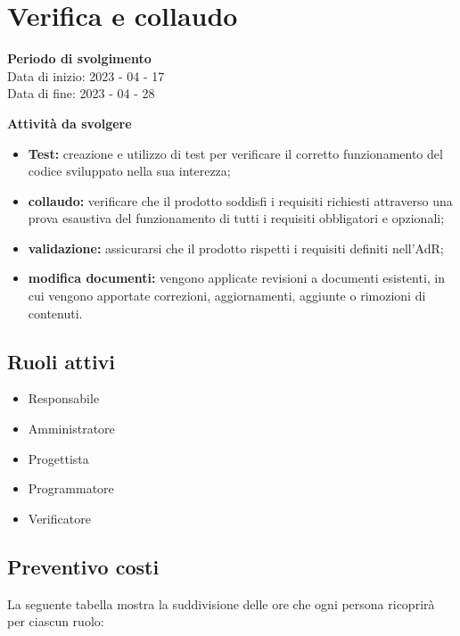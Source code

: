 \section{Verifica e collaudo}

\textbf{Periodo di svolgimento}
\\ Data di inizio: 2023 - 04 - 17 \\ Data di fine: 2023 - 04 - 28

\textbf{Attività da svolgere}
    \begin{itemize}
        \item \textbf{Test:} creazione e utilizzo di test per verificare il corretto funzionamento del codice sviluppato nella sua interezza; 
        \item \textbf{collaudo:} verificare che il prodotto soddisfi i requisiti richiesti attraverso una prova esaustiva del funzionamento di tutti i requisiti obbligatori e opzionali;
        \item \textbf{validazione:} assicurarsi che il prodotto rispetti i requisiti definiti nell'AdR;
        \item \textbf{modifica documenti:} vengono applicate revisioni a documenti esistenti, in cui vengono apportate correzioni, aggiornamenti, aggiunte o rimozioni di contenuti.
    \end{itemize}

\subsection{Ruoli attivi}
\begin{itemize}
    \item Responsabile 
    \item Amministratore 
    \item Progettista 
    \item Programmatore 
    \item Verificatore 
\end{itemize}

\subsection{Preventivo costi}

La seguente tabella mostra la suddivisione delle ore che ogni persona ricoprirà per ciascun ruolo:

